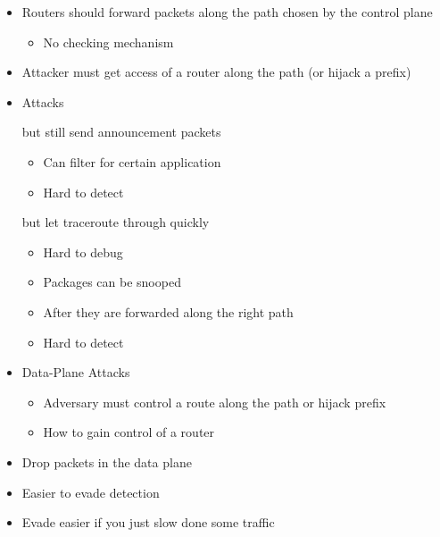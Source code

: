 \begin{itemize}
        \begin{itemize}
            \item Routers should forward packets along the path chosen by the control plane
                \begin{itemize}
                    \item No checking mechanism
                \end{itemize}
            \item Attacker must get access of a router along the path (or hijack a prefix)
            \item Attacks
                \begin{itemize}
                     but still send announcement packets
                        \begin{itemize}
                            \item Can filter for certain application
                            \item Hard to detect
                        \end{itemize}
                     but let traceroute through quickly
                        \begin{itemize}
                            \item Hard to debug
                        \end{itemize}
                        \begin{itemize}
                            \item Packages can be snooped
                            \item After they are forwarded along the right path
                            \item Hard to detect
                        \end{itemize}
                \end{itemize}

            \item Data-Plane Attacks
                \begin{itemize}
                    \item Adversary must control a route along the path or hijack prefix
                    \item How to gain control of a router
                \end{itemize}
            \item Drop packets in the data plane
            \item Easier to evade detection
            \item Evade easier if you just slow done some traffic



\end{itemize}
\end{itemize}
